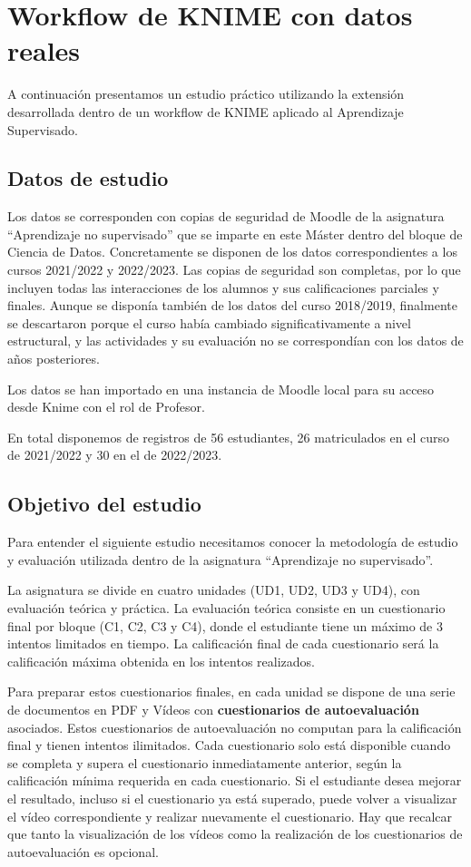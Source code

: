 \newpage
\section{Workflow de KNIME con datos reales}

A continuación presentamos un estudio práctico utilizando la extensión desarrollada dentro 
de un workflow de KNIME aplicado al Aprendizaje Supervisado. 

\subsection{Datos de estudio}

Los datos se corresponden con copias de seguridad de Moodle de la asignatura ``Aprendizaje no supervisado'' que se imparte en este Máster dentro del bloque de Ciencia de Datos. 
Concretamente se disponen de los datos correspondientes a los cursos 2021/2022 y 2022/2023. Las copias de seguridad son completas, por lo que incluyen todas las interacciones de los alumnos y sus calificaciones parciales y finales. 
Aunque se disponía también de los datos del curso 2018/2019, finalmente se descartaron porque el curso había cambiado significativamente a nivel estructural, y las actividades y su evaluación no se correspondían con los datos de años posteriores. 
\

Los datos se han importado en una instancia de Moodle local para su acceso desde Knime con el rol de Profesor. 
\

En total disponemos de registros de 56 estudiantes, 26 matriculados en el curso de 2021/2022 y 30 en el de 2022/2023. 

\subsection{Objetivo del estudio}

Para entender el siguiente estudio necesitamos conocer la metodología de estudio y evaluación utilizada dentro de la asignatura ``Aprendizaje no supervisado''. 
\

La asignatura se divide en cuatro unidades (UD1, UD2, UD3 y UD4), con evaluación teórica y práctica. La evaluación teórica consiste
en un cuestionario final por bloque (C1, C2, C3 y C4), donde el estudiante tiene un máximo de 3 intentos limitados en tiempo. 
La calificación final de cada cuestionario será la calificación máxima obtenida en los intentos realizados. 
\

Para preparar estos cuestionarios finales, en cada unidad se dispone de una serie de documentos en PDF y Vídeos con \textbf{cuestionarios de autoevaluación} asociados. 
Estos cuestionarios de autoevaluación no computan para la calificación final y tienen intentos ilimitados. Cada cuestionario solo está disponible cuando se 
completa y supera el cuestionario inmediatamente anterior, según la calificación mínima requerida en cada cuestionario. Si el estudiante desea mejorar el resultado, incluso si 
el cuestionario ya está superado, puede volver a visualizar el vídeo correspondiente y realizar nuevamente el cuestionario. Hay que recalcar que tanto la visualización de 
los vídeos como la realización de los cuestionarios de autoevaluación es opcional. 
\

